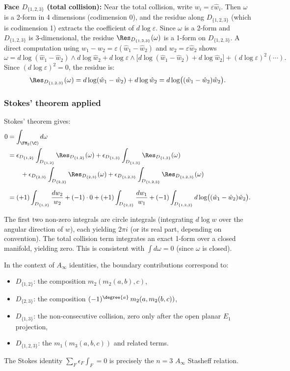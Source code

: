 \textbf{Face $D_{\{1,2,3\}}$ (total collision):}
Near the total collision, write $w_i = \varepsilon\hat{w}_i$. Then $\omega$ is a 2-form in 4 dimensions (codimension 0), and the residue along $D_{\{1,2,3\}}$ (which is codimension 1) extracts the coefficient of $d\log\varepsilon$. Since $\omega$ is a 2-form and $D_{\{1,2,3\}}$ is 3-dimensional, the residue $\Res_{D_{\{1,2,3\}}}(\omega)$ is a 1-form on $D_{\{1,2,3\}}$. A direct computation using $w_1 - w_2 = \varepsilon(\hat{w}_1-\hat{w}_2)$ and $w_2 = \varepsilon\hat{w}_2$ shows
\[
\omega = d\log(\hat{w}_1-\hat{w}_2)\wedge d\log\hat{w}_2 + d\log\varepsilon\wedge\bigl[d\log(\hat{w}_1-\hat{w}_2) + d\log\hat{w}_2\bigr] + (d\log\varepsilon)^2(\cdots).
\]
Since $(d\log\varepsilon)^2 = 0$, the residue is:
\[
\Res_{D_{\{1,2,3\}}}(\omega) = d\log(\hat{w}_1-\hat{w}_2) + d\log\hat{w}_2 = d\log\bigl((\hat{w}_1-\hat{w}_2)\hat{w}_2\bigr).
\]

\subsubsection{Stokes' theorem applied}

Stokes' theorem gives:
\begin{align*}
0 &= \int_{\FM_3(\C)} d\omega\\
&= \epsilon_{D_{\{1,2\}}}\int_{D_{\{1,2\}}}\Res_{D_{\{1,2\}}}(\omega) + \epsilon_{D_{\{1,3\}}}\int_{D_{\{1,3\}}}\Res_{D_{\{1,3\}}}(\omega)\\
&\qquad + \epsilon_{D_{\{2,3\}}}\int_{D_{\{2,3\}}}\Res_{D_{\{2,3\}}}(\omega) + \epsilon_{D_{\{1,2,3\}}}\int_{D_{\{1,2,3\}}}\Res_{D_{\{1,2,3\}}}(\omega)\\[6pt]
&= (+1)\int_{D_{\{1,2\}}}\frac{dw_2}{w_2} + (-1)\cdot 0 + (+1)\int_{D_{\{2,3\}}}\frac{dw_1}{w_1} + (-1)\int_{D_{\{1,2,3\}}}d\log\bigl((\hat{w}_1-\hat{w}_2)\hat{w}_2\bigr).
\end{align*}

The first two non-zero integrals are circle integrals (integrating $d\log w$ over the angular direction of $w$), each yielding $2\pi i$ (or its real part, depending on convention). The total collision term integrates an exact 1-form over a closed manifold, yielding zero. This is consistent with $\int d\omega = 0$ (since $\omega$ is closed).

\begin{remark}
In the context of $A_\infty$ identities, the boundary contributions correspond to:
\begin{itemize}
\item $D_{\{1,2\}}$: the composition $m_2(m_2(a,b),c)$,
\item $D_{\{2,3\}}$: the composition $(-1)^{\degree{a}}\,m_2(a,m_2(b,c))$,
\item $D_{\{1,3\}}$: the non-consecutive collision, zero only after
the open planar \(E_1\) projection,
\item $D_{\{1,2,3\}}$: the $m_1(m_3(a,b,c))$ and related terms.
\end{itemize}
The Stokes identity $\sum_F \epsilon_F \int_F = 0$ is precisely the $n=3$ $A_\infty$ Stasheff relation.
\end{remark}

